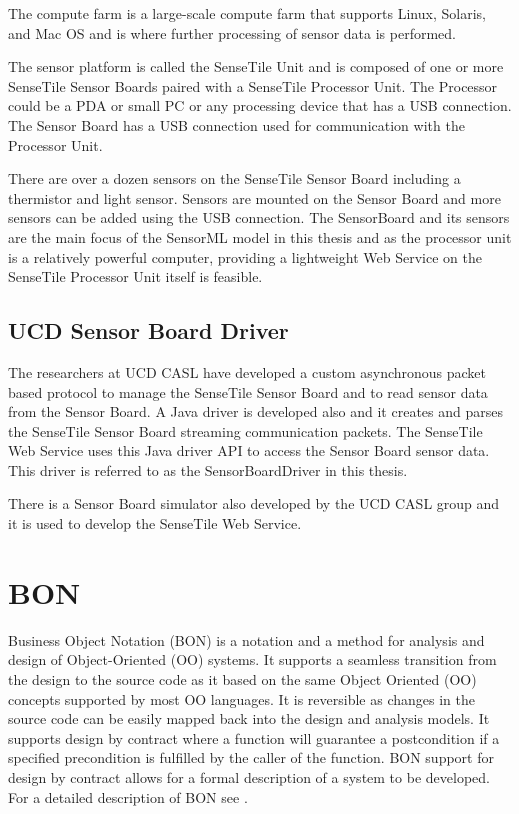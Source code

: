 \documentclass[]{final_report}
\begin{document}
The compute farm is a large-scale compute farm that supports Linux, Solaris, and Mac OS and is where further processing of sensor data is performed.

The sensor platform is called the SenseTile Unit and is composed of one or more SenseTile Sensor Boards paired with a SenseTile Processor Unit. The Processor could be a PDA or small PC or any processing device that has a USB connection.  The Sensor Board has a USB connection used for communication with the Processor Unit. 

There are over a dozen sensors on the SenseTile Sensor Board including a thermistor and light sensor. Sensors are mounted on the Sensor Board and more sensors can be added using the USB connection. The SensorBoard and its sensors are the main focus of the SensorML model in this thesis and as the processor unit is a relatively powerful computer, providing a lightweight Web Service on the SenseTile Processor Unit itself is feasible.

\subsection{UCD Sensor Board Driver}\label{SensorBoardDriverSec}

The researchers at UCD CASL have developed a custom asynchronous packet based protocol to manage the SenseTile Sensor Board and to read sensor data from the Sensor Board.  A Java driver is developed also and it creates and parses the SenseTile Sensor Board streaming communication packets. The SenseTile Web Service uses this Java driver API to access the Sensor Board sensor data. This driver is referred to as the SensorBoardDriver in this thesis.

There is a Sensor Board simulator also developed by the UCD CASL group and it is used to develop the SenseTile Web Service.


\section{BON} \label{BONsec}
Business Object Notation (BON) is a notation and a method for analysis and design of Object-Oriented (OO) systems. It supports a seamless transition from the design to the source code as it based on the same Object Oriented (OO) concepts supported by most OO languages. It is reversible as changes in the source code can be easily mapped back into the design and analysis models. It supports design by contract\cite{Meyerref} where a function will guarantee a postcondition if a specified precondition is fulfilled by the caller of the function. BON support for design by contract allows for a formal description of a system to be developed. For a detailed description of BON see \cite{BONref}.
\end{document}
